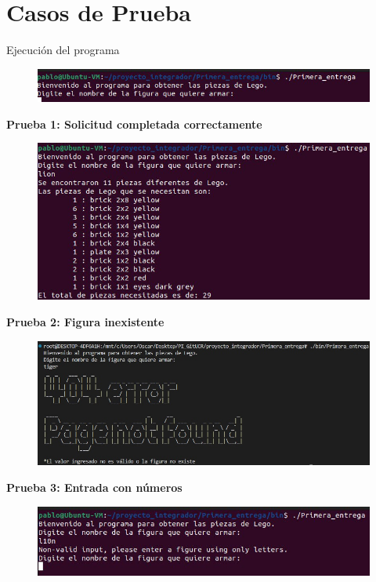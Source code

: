 \documentclass[a4paper,10pt]{article}
\begin{document}
	
	\newpage
	
	\section{Casos de Prueba}
	Ejecución del programa
		\begin{figure}[ht]
 	  	\centering
 	  	\includegraphics[scale=.5]{execution.jpeg}
	 	\end{figure}

	\noindent \textbf{Prueba 1: Solicitud completada correctamente}\\
	
		\begin{figure}[ht]
 	  	\centering
 	  	\includegraphics[scale=.5]{success.jpeg}
	 	\end{figure}
	
	\noindent \textbf{Prueba 2: Figura inexistente}\\
		\begin{figure}[ht]
 	  	\centering
 	  	\includegraphics[scale=.7]{not_exist_animal.jpeg}
	 	\end{figure}
        \newpage
        \vfill
    	\noindent \textbf{Prueba 3: Entrada con números}\\%
    		\begin{figure}[ht]
 	  	\centering
 	  	\includegraphics[scale=.5]{error_numbers.jpeg}
	 	\end{figure}
	 	
\end{document}
